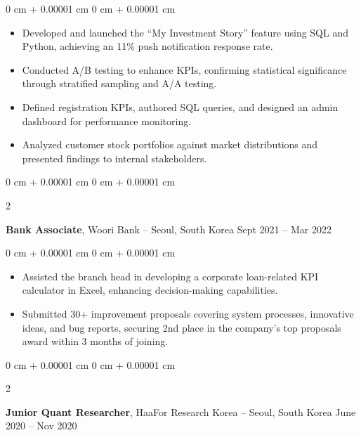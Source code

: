 \documentclass[10pt, letterpaper]{article}
\newenvironment{highlights}{
    \begin{itemize}[
        topsep=0.10 cm,
        parsep=0.10 cm,
        partopsep=0pt,
        itemsep=0pt,
        leftmargin=0 cm + 10pt
    ]
}{
    \end{itemize}
} %
\newenvironment{onecolentry}{
    \begin{adjustwidth}{
        0 cm + 0.00001 cm
    }{
        0 cm + 0.00001 cm
    }
}{
    \end{adjustwidth}
} %
\newenvironment{twocolentry}[2][]{
    \onecolentry
    \def\secondColumn{#2}
    \setcolumnwidth{\fill, 4.5 cm}
    \begin{paracol}{2}
}{
    \switchcolumn \raggedleft \secondColumn
    \end{paracol}
    \endonecolentry
} %
\begin{document}
        \vspace{0.10 cm}
        \begin{onecolentry}
            \begin{highlights}
                \item Developed and launched the “My Investment Story” feature using SQL and Python, achieving an 11\% push notification response rate.
                \item Conducted A/B testing to enhance KPIs, confirming statistical significance through stratified sampling and A/A testing.
                \item Defined registration KPIs, authored SQL queries, and designed an admin dashboard for performance monitoring.
                \item Analyzed customer stock portfolios against market distributions and presented findings to internal stakeholders.
            \end{highlights}
        \end{onecolentry}


        \vspace{0.2 cm}

        \begin{twocolentry}{
            Sept 2021 – Mar 2022
        }
            \textbf{Bank Associate}, Woori Bank -- Seoul, South Korea\end{twocolentry}

        \vspace{0.10 cm}
        \begin{onecolentry}
            \begin{highlights}
                \item Assisted the branch head in developing a corporate loan-related KPI calculator in Excel, enhancing decision-making capabilities.
                \item Submitted 30+ improvement proposals covering system processes, innovative ideas, and bug reports, securing 2nd place in the company’s top proposals award within 3 months of joining.
            \end{highlights}
        \end{onecolentry}


        \vspace{0.2 cm}

        \begin{twocolentry}{
            June 2020 – Nov 2020
        }
            \textbf{Junior Quant Researcher}, HaaFor Research Korea -- Seoul, South Korea\end{twocolentry}
\end{document}
